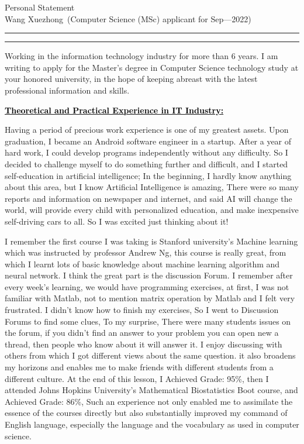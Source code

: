 \documentclass[12pt]{article}
\newcommand{\soptitle}{Personal Statement}
\newcommand{\yourname}{Wang Xuezhong}
\newcommand{\statement}[1]{\par\medskip
  \underline{\textcolor{black}{\textbf{#1:}}}\space
}
\begin{document}
\begin{center}\LARGE\soptitle\\
\large \yourname\ (Computer Science (MSc) applicant for Sep---2022)
\end{center}

\hrule
\vspace{1pt}
\hrule height 1pt


\sffamily
\mdseries



\bigskip

Working in the information technology industry for more than 6 years. I am writing to apply for the Master's degree in Computer Science technology study at your honored university, in the hope of keeping abreast with the latest professional information and skills.

\bigskip

\statement{Theoretical and Practical Experience in IT Industry}
Having a period of precious work experience is one of my greatest assets. Upon graduation, I became an Android software engineer in a startup. After a year of hard work, I could develop programs independently without any difficulty. So I decided to challenge myself to do something further and difficult, and I started self-education in artificial intelligence; In the beginning, I hardly know anything about this area, but I know Artificial Intelligence is amazing, There were so many reports and information on newspaper and internet, and said AI will change the world, will provide every child with personalized education, and make inexpensive self-driving cars to all. So I was excited just thinking about it! 

\bigskip

I remember the first course I was taking is Stanford university's Machine learning which was instructed by professor Andrew Ng, this course is really great, from which I learnt lots of basic knowledge about machine learning algorithm and neural network. I think the great part is the discussion Forum. I remember after every week's learning, we would have programming exercises, at first, I was not familiar with Matlab, not to mention matrix operation by Matlab and I felt very frustrated. I didn't know how to finish my exercises, So I went to Discussion Forums to find some clues, To my surprise, There were many students issues on the forum, if you didn't find an answer to your problem you can open new a thread, then people who know about it will answer it. I enjoy discussing with others from which I got different views about the same question. it also broadens my horizons and enables me to make friends with different students from a different culture. At the end of this lesson, I Achieved Grade: 95\%, then I attended Johns Hopkins University's Mathematical Biostatistics Boot course, and Achieved Grade: 86\%, Such an experience not only enabled me to assimilate the essence of the courses directly but also substantially improved my command of English language, especially the language and the vocabulary as used in computer science.
\end{document}
